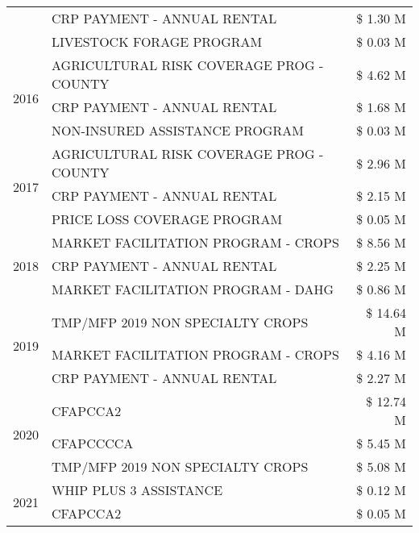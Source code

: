 \begin{tabular}{llr}
 & CRP PAYMENT - ANNUAL RENTAL & \$ 1.30 M \\
 & LIVESTOCK FORAGE PROGRAM & \$ 0.03 M \\
\cline{1-3}
\multirow[t]{3}{*}{2016} & AGRICULTURAL RISK COVERAGE PROG - COUNTY & \$ 4.62 M \\
 & CRP PAYMENT - ANNUAL RENTAL & \$ 1.68 M \\
 & NON-INSURED ASSISTANCE PROGRAM & \$ 0.03 M \\
\cline{1-3}
\multirow[t]{3}{*}{2017} & AGRICULTURAL RISK COVERAGE PROG - COUNTY & \$ 2.96 M \\
 & CRP PAYMENT - ANNUAL RENTAL & \$ 2.15 M \\
 & PRICE LOSS COVERAGE PROGRAM & \$ 0.05 M \\
\cline{1-3}
\multirow[t]{3}{*}{2018} & MARKET FACILITATION PROGRAM - CROPS & \$ 8.56 M \\
 & CRP PAYMENT - ANNUAL RENTAL & \$ 2.25 M \\
 & MARKET FACILITATION PROGRAM - DAHG & \$ 0.86 M \\
\cline{1-3}
\multirow[t]{3}{*}{2019} & TMP/MFP 2019 NON SPECIALTY CROPS & \$ 14.64 M \\
 & MARKET FACILITATION PROGRAM - CROPS & \$ 4.16 M \\
 & CRP PAYMENT - ANNUAL RENTAL & \$ 2.27 M \\
\cline{1-3}
\multirow[t]{3}{*}{2020} & CFAPCCA2 & \$ 12.74 M \\
 & CFAPCCCCA & \$ 5.45 M \\
 & TMP/MFP 2019 NON SPECIALTY CROPS & \$ 5.08 M \\
\cline{1-3}
\multirow[t]{2}{*}{2021} & WHIP PLUS 3 ASSISTANCE & \$ 0.12 M \\
 & CFAPCCA2 & \$ 0.05 M \\
\cline{1-3}
\bottomrule
\end{tabular}
